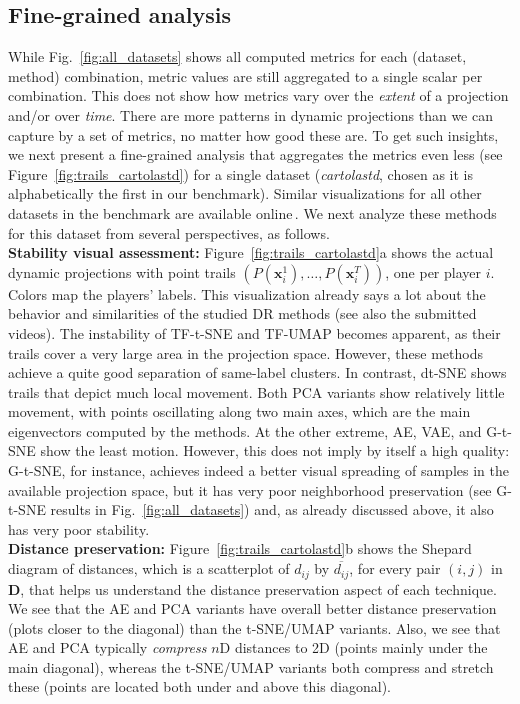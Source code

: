 \subsection{Fine-grained analysis}
%
While Fig.~\ref{fig:all_datasets} shows all computed metrics for each (dataset, method) combination, metric values are still aggregated to a single scalar per combination. This does not show how metrics vary over the \emph{extent} of a projection and/or over \emph{time}. There are more patterns in dynamic projections than we can capture by a set of metrics, no matter how good these are. To get such insights, we next present a fine-grained analysis that aggregates the metrics even less (see Figure~\ref{fig:trails_cartolastd}) for a single dataset (\emph{cartolastd}, chosen as it is alphabetically the first in our benchmark).
Similar visualizations for all other datasets in the benchmark are available online\,\citep{repo}. We next analyze these methods for this dataset from several perspectives, as follows.\\

\noindent\textbf{Stability visual assessment:} Figure~\ref{fig:trails_cartolastd}a shows the actual dynamic projections with point trails $(P(\mathbf{x}_i^1),\ldots, P(\mathbf{x}_i^T))$, one per player $i$. Colors map the players' labels. This visualization already says a lot about the behavior and similarities of the studied DR methods (see also the submitted videos). The instability of TF-t-SNE and TF-UMAP becomes apparent, as their trails cover a very large area in the projection space. However, these methods achieve a quite good separation of same-label clusters. In contrast, dt-SNE shows trails that depict much local movement. Both PCA variants show relatively little movement, with points oscillating along two main axes, which are the main eigenvectors computed by the methods. At the other extreme, AE, VAE, and G-t-SNE show the least motion. However, this does not imply by itself a high quality: G-t-SNE, for instance, achieves indeed a better visual spreading of samples in the available projection space, but it has very poor neighborhood preservation (see G-t-SNE results in Fig.~\ref{fig:all_datasets}) and, as already discussed above, it also has very poor stability.\\

\noindent\textbf{Distance preservation:} Figure~\ref{fig:trails_cartolastd}b shows the Shepard diagram of distances, which is a scatterplot of $d_{ij}$ by $\overline{d_{ij}}$, for every pair $(i,j)$ in $\mathbf{D}$, that helps us understand the distance preservation aspect of each technique. We see that the AE and PCA variants have overall better distance preservation (plots closer to the diagonal) than the t-SNE/UMAP variants. Also, we see that AE and PCA typically \emph{compress} $n$D distances to 2D (points mainly under the main diagonal), whereas the t-SNE/UMAP variants both compress and stretch these (points are located both under and above this diagonal).\\


